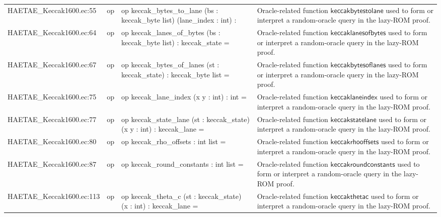\documentclass[10pt]{article}
\begin{document}
\begin{longtable}{L{0.11\textwidth}L{0.055\textwidth}L{0.385\textwidth}L{0.41\textwidth}}
HAETAE\_\allowbreak{}Keccak1600.\allowbreak{}ec:\allowbreak{}55 & op & {\ttfamily\scriptsize op keccak\_\allowbreak{}bytes\_\allowbreak{}to\_\allowbreak{}lane (bs : keccak\_\allowbreak{}byte list) (lane\_\allowbreak{}index : int) :} & Oracle-related function $\mathsf{keccakbytestolane}$ used to form or interpret a random-oracle query in the lazy-ROM proof. \\
HAETAE\_\allowbreak{}Keccak1600.\allowbreak{}ec:\allowbreak{}64 & op & {\ttfamily\scriptsize op keccak\_\allowbreak{}lanes\_\allowbreak{}of\_\allowbreak{}bytes (bs : keccak\_\allowbreak{}byte list) : keccak\_\allowbreak{}state =} & Oracle-related function $\mathsf{keccaklanesofbytes}$ used to form or interpret a random-oracle query in the lazy-ROM proof. \\
HAETAE\_\allowbreak{}Keccak1600.\allowbreak{}ec:\allowbreak{}67 & op & {\ttfamily\scriptsize op keccak\_\allowbreak{}bytes\_\allowbreak{}of\_\allowbreak{}lanes (st : keccak\_\allowbreak{}state) : keccak\_\allowbreak{}byte list =} & Oracle-related function $\mathsf{keccakbytesoflanes}$ used to form or interpret a random-oracle query in the lazy-ROM proof. \\
HAETAE\_\allowbreak{}Keccak1600.\allowbreak{}ec:\allowbreak{}75 & op & {\ttfamily\scriptsize op keccak\_\allowbreak{}lane\_\allowbreak{}index (x y : int) : int =} & Oracle-related function $\mathsf{keccaklaneindex}$ used to form or interpret a random-oracle query in the lazy-ROM proof. \\
HAETAE\_\allowbreak{}Keccak1600.\allowbreak{}ec:\allowbreak{}77 & op & {\ttfamily\scriptsize op keccak\_\allowbreak{}state\_\allowbreak{}lane (st : keccak\_\allowbreak{}state) (x y : int) : keccak\_\allowbreak{}lane =} & Oracle-related function $\mathsf{keccakstatelane}$ used to form or interpret a random-oracle query in the lazy-ROM proof. \\
HAETAE\_\allowbreak{}Keccak1600.\allowbreak{}ec:\allowbreak{}80 & op & {\ttfamily\scriptsize op keccak\_\allowbreak{}rho\_\allowbreak{}offsets : int list =} & Oracle-related function $\mathsf{keccakrhooffsets}$ used to form or interpret a random-oracle query in the lazy-ROM proof. \\
HAETAE\_\allowbreak{}Keccak1600.\allowbreak{}ec:\allowbreak{}87 & op & {\ttfamily\scriptsize op keccak\_\allowbreak{}round\_\allowbreak{}constants : int list =} & Oracle-related function $\mathsf{keccakroundconstants}$ used to form or interpret a random-oracle query in the lazy-ROM proof. \\
HAETAE\_\allowbreak{}Keccak1600.\allowbreak{}ec:\allowbreak{}113 & op & {\ttfamily\scriptsize op keccak\_\allowbreak{}theta\_\allowbreak{}c (st : keccak\_\allowbreak{}state) (x : int) : keccak\_\allowbreak{}lane =} & Oracle-related function $\mathsf{keccakthetac}$ used to form or interpret a random-oracle query in the lazy-ROM proof. \\

\end{longtable}
\end{document}
